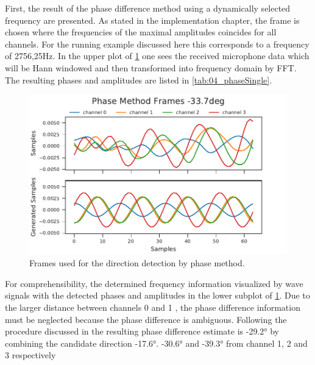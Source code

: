 First, the result of the phase difference method using a  dynamically selected
frequency are presented. As stated in the implementation chapter, the frame is
chosen where the frequencies of the maximal
amplitudes coincides for all channels. For the running example discussed here
this corresponds to a frequency of 2756,25\si{\hertz}.
In the upper plot of \cref{fig:04_phaseSingle}
 one sees the received microphone
data which will be Hann windowed and then transformed into frequency domain by
\ac{FFT}. The resulting phases and amplitudes are listed in
\cref{tab:04_phaseSingle}.
\begin{figure}[H]
	\centering
		\includegraphics[]{figures/evaluation/phase_cos}
	\caption{Frames used for the direction detection by phase method.}
	\label{fig:04_phaseSingle}
\end{figure}
For comprehensibility, the determined frequency information visualized by
wave signals with the detected phases and amplitudes
in the lower subplot of \cref{fig:04_phaseSingle}.
Due to the larger distance between channels 0 and 1 , the phase difference information must
be neglected because the phase difference is ambiguous. Following the procedure
discussed in  the resulting phase difference estimate
is -29.2\si{\degree} by combining the candidate direction -17.6\si{\degree}.
-30.6\si{\degree} and -39.3\si{\degree} from channel 1, 2 and 3 respectively
